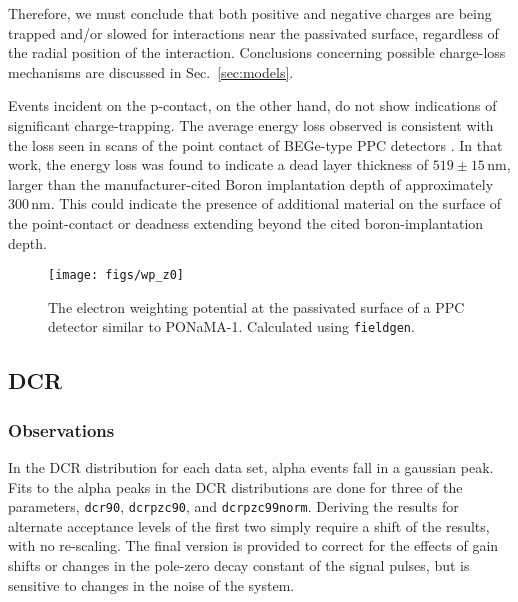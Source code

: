 \documentclass[groupedaddress,rmp,amsmath,amssymb,bibnotes,altaffilletter,twocolumn]{revtex4-1}
\begin{document}
Therefore, we must conclude that both positive and negative charges are being trapped and/or slowed for interactions near the passivated surface, regardless of the radial position of the interaction. Conclusions concerning possible charge-loss mechanisms are discussed in Sec.~\ref{sec:models}.

Events incident on the p-contact, on the other hand, do not show indications of significant charge-trapping. The average energy loss observed is consistent with the loss seen in scans of the point contact of BEGe-type PPC detectors \cite{Agostini_thesis}. In that work, the energy loss was found to indicate a dead layer thickness of $519\pm15$\,nm, larger than the manufacturer-cited Boron implantation depth of approximately 300\,nm. This could indicate the presence of additional material on the surface of the point-contact or deadness extending beyond the cited boron-implantation depth. 

\begin{figure}[]
 \centering
 \texttt{[image: figs/wp\_z0]}
 \caption{The electron weighting potential at the passivated surface of a PPC detector similar to PONaMA-1. Calculated using {\tt fieldgen}.} 
 \label{fig:wp_z0}
\end{figure}

\subsection{DCR}
\subsubsection{Observations}
 In the DCR distribution for each data set, alpha events fall in a gaussian peak. Fits to the alpha peaks in the DCR distributions are done for three of the parameters, {\tt dcr90}, {\tt dcrpzc90}, and {\tt dcrpzc99norm}. Deriving the results for alternate acceptance levels of the first two simply require a shift of the results, with no re-scaling. The final version is provided to correct for the effects of gain shifts or changes in the pole-zero decay constant of the signal pulses, but is sensitive to changes in the noise of the system. 
\end{document}
